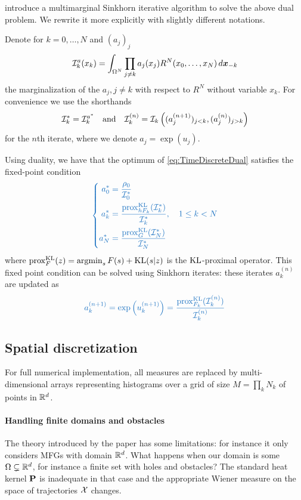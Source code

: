 \documentclass[../report.tex]{subfiles}
\begin{document}
\textcite{benamou2018entropy} introduce a multimarginal Sinkhorn iterative algorithm to solve the above dual problem. We rewrite it more explicitly with slightly different notations.

\begin{prop}\label{algo:Sinkhorn}
	Denote for $k=0,\ldots,N$ and $(a_j)_{j}$
	\[
	\mathcal{I}^a_k(x_k) = 
	\int_{\Omega^N}
	\prod_{j\neq k} a_j(x_j)
	R^N(x_0,\ldots,x_N)\,d\boldsymbol{x}_{-k}
	\]
	the marginalization of the $a_j,j\neq k$ with respect to $R^N$ without variable $x_k$.
	For convenience we use the shorthands
	\begin{align*}
	\mathcal{I}_k^* = \mathcal{I}_k^{a^*} \quad \text{and}\quad \mathcal{I}_k^{(n)} = \mathcal{I}_k\left((a^{(n+1)}_j)_{j<k},
	(a^{(n)}_j)_{j>k}\right)
	\end{align*}
	for the $n$th iterate, where we denote $a_j = \exp(u_j)$.
	
	Using duality, we have that the optimum of \eqref{eq:TimeDiscreteDual} satisfies the fixed-point condition
	\begin{equation*}\bluefont\left\{
	\begin{aligned}
		a^*_0 &= \frac{\rho_0}{\calI_0^*}  \\
		a^*_k &= \frac{\prox_{hF_k}^{\KL}(\calI_k^*)}{\calI_k^*}, \quad 1\leq k < N  \\
		a^*_N &= \frac{
			\prox_{G}^{\KL}(\calI_N^*)}{\calI_N^*
		}
	\end{aligned}\right.
	\end{equation*}
	where $\operatorname{prox}_F^{\operatorname{KL}}(z) = \operatorname*{argmin}_{s} F(s) + \operatorname{KL}(s|z)$ is the $\operatorname{KL}$-proximal operator.
	This fixed point condition can be solved using Sinkhorn iterates: these iterates $a_k^{(n)}$ are updated as
	\begin{equation}
	{\bluefont
	a_k^{(n+1)} = \exp\left(u^{(n+1)}_k\right) =
	\frac{
		\prox_{F_k}^{\KL}(\calI_k^{(n)})
	}{\calI_k^{(n)}}}
	\end{equation}
\end{prop}




\subsection{Spatial discretization}\label{sec:PartialDiscret}

For full numerical implementation, all measures are replaced by multi-dimensional arrays representing histograms over a grid of size $M = \prod_k N_k$ of points in $\mathbb{R}^d$.

\paragraph{Handling finite domains and obstacles}\label{sec:Finitedomainobstacles}
The theory introduced by the paper has some limitations: for instance it only considers MFGs with domain $\mathbb{R}^d$. What happens when our domain is some $\Omega \subsetneq \mathbb{R}^d$, for instance a finite set with holes and obstacles? The standard heat kernel $\mathbf{P}$ is inadequate in that case and the appropriate Wiener measure on the space of trajectories $\mathcal{X}$ changes.
\end{document}
